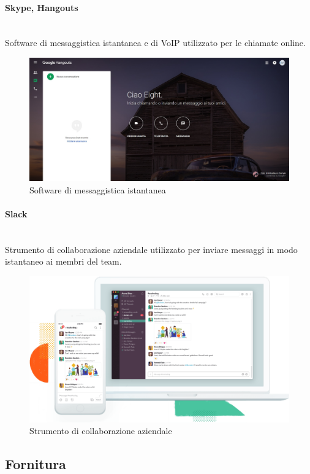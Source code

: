 \paragraph{Skype, Hangouts} \mbox{}\\
Software di messaggistica istantanea e di VoIP utilizzato per le chiamate online.
\begin{figure}[H]
	\includegraphics[width=0.99\linewidth]{res/images/Hangouts.jpg}
	\caption{Software di messaggistica istantanea}
\end{figure} 
\paragraph{Slack} \mbox{}\\
Strumento di collaborazione aziendale utilizzato per inviare messaggi in modo istantaneo ai membri del team.
\begin{figure}[H]
	\includegraphics[width=0.99\linewidth]{res/images/slack.png}
	\caption{Strumento di collaborazione aziendale}
\end{figure} 
\subsection{Fornitura}
